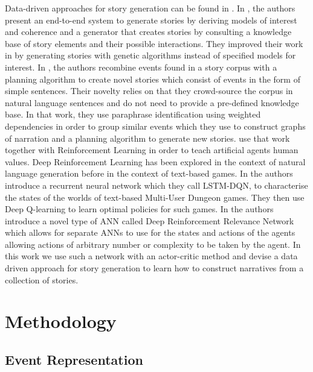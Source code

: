 \documentclass[11pt,letterpaper]{article}
\begin{document}
Data-driven approaches for story generation can be found in \cite{mcintyre2009learning,li2013story}. In \cite{mcintyre2009learning}, the authors present an end-to-end system to generate stories by deriving models of interest and coherence and a generator that creates stories by consulting a knowledge base of story elements and their possible interactions. They improved their work in \cite{mcintyre2010plot} by generating stories with genetic algorithms instead of specified models for interest. In \cite{li2013story}, the authors recombine events found in a story corpus with a planning algorithm to create novel stories which consist of events in the form of simple sentences. Their novelty relies on that they crowd-source the corpus in natural language sentences and do not need to provide a pre-defined knowledge base. In that work, they use paraphrase identification using weighted dependencies \cite{lintean2009paraphrase} in order to group similar events which they use to construct graphs of narration and a planning algorithm to generate new stories. \cite{riedl2016using} use that work together with Reinforcement Learning in order to teach artificial agents human values.  Deep Reinforcement Learning has been explored in the context of natural language generation before in the context of text-based games. In \cite{narasimhan2015language} the authors introduce a recurrent neural network which they call LSTM-DQN, to characterise the states of the worlds of text-based Multi-User Dungeon games. They then use Deep Q-learning \cite{mnih2015human} to learn optimal policies for such games. In \cite{he2015deep} the authors introduce a novel type of ANN called Deep Reinforcement Relevance Network which allows for separate ANNs to use for the states and actions of the agents allowing actions of arbitrary number or complexity to be taken by the agent. In this work we use such a network with an actor-critic method and devise a data driven approach for story generation to learn how to construct narratives from a collection of stories.







\section{Methodology}





\subsection{Event Representation}
\label{section:eventrepresentation}
\end{document}
